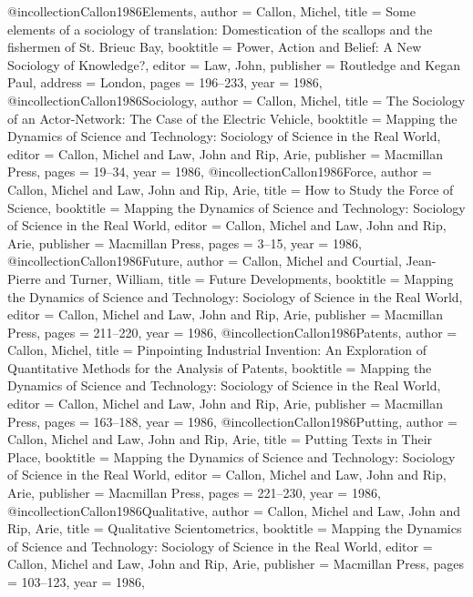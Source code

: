 @incollection{Callon1986Elements,
  author    = {Callon, Michel},
  title     = {{Some elements of a sociology of translation: Domestication of the scallops and the fishermen of St. Brieuc Bay}},
  booktitle = {{Power, Action and Belief: A New Sociology of Knowledge?}},
  editor    = {Law, John},
  publisher = {Routledge and Kegan Paul},
  address   = {London},
  pages     = {196--233},
  year      = {1986},
}
@incollection{Callon1986Sociology,
  author    = {Callon, Michel},
  title     = {{The Sociology of an Actor-Network: The Case of the Electric Vehicle}},
  booktitle = {{Mapping the Dynamics of Science and Technology: Sociology of Science in the Real World}},
  editor    = {Callon, Michel and Law, John and Rip, Arie},
  publisher = {Macmillan Press},
  pages     = {19--34},
  year      = {1986},
}
@incollection{Callon1986Force,
  author    = {Callon, Michel and Law, John and Rip, Arie},
  title     = {{How to Study the Force of Science}},
  booktitle = {{Mapping the Dynamics of Science and Technology: Sociology of Science in the Real World}},
  editor    = {Callon, Michel and Law, John and Rip, Arie},
  publisher = {Macmillan Press},
  pages     = {3--15},
  year      = {1986},
}
@incollection{Callon1986Future,
  author    = {Callon, Michel and Courtial, Jean-Pierre and Turner, William},
  title     = {{Future Developments}},
  booktitle = {{Mapping the Dynamics of Science and Technology: Sociology of Science in the Real World}},
  editor    = {Callon, Michel and Law, John and Rip, Arie},
  publisher = {Macmillan Press},
  pages     = {211--220},
  year      = {1986},
}
@incollection{Callon1986Patents,
  author    = {Callon, Michel},
  title     = {{Pinpointing Industrial Invention: An Exploration of Quantitative Methods for the Analysis of Patents}},
  booktitle = {{Mapping the Dynamics of Science and Technology: Sociology of Science in the Real World}},
  editor    = {Callon, Michel and Law, John and Rip, Arie},
  publisher = {Macmillan Press},
  pages     = {163--188},
  year      = {1986},
}
@incollection{Callon1986Putting,
  author    = {Callon, Michel and Law, John and Rip, Arie},
  title     = {{Putting Texts in Their Place}},
  booktitle = {{Mapping the Dynamics of Science and Technology: Sociology of Science in the Real World}},
  editor    = {Callon, Michel and Law, John and Rip, Arie},
  publisher = {Macmillan Press},
  pages     = {221--230},
  year      = {1986},
}
@incollection{Callon1986Qualitative,
  author    = {Callon, Michel and Law, John and Rip, Arie},
  title     = {{Qualitative Scientometrics}},
  booktitle = {{Mapping the Dynamics of Science and Technology: Sociology of Science in the Real World}},
  editor    = {Callon, Michel and Law, John and Rip, Arie},
  publisher = {Macmillan Press},
  pages     = {103--123},
  year      = {1986},
}
